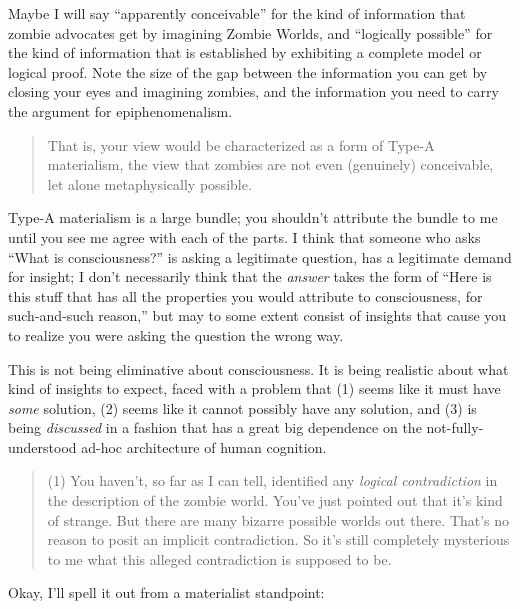 {
 Maybe I will say ``apparently
conceivable'' for the kind of information that zombie
advocates get by imagining Zombie Worlds, and
``logically possible'' for the kind
of information that is established by exhibiting a complete model or
logical proof. Note the size of the gap between the information you can
get by closing your eyes and imagining zombies, and the information you
need to carry the argument for epiphenomenalism.}

\begin{quotation}

{
 That is, your view would be characterized as a form of Type-A
materialism, the view that zombies are not even (genuinely)
conceivable, let alone metaphysically possible.}

\end{quotation}

{
 Type-A materialism is a large bundle; you
shouldn't attribute the bundle to me until you see me
agree with each of the parts. I think that someone who asks
``What is consciousness?'' is asking
a legitimate question, has a legitimate demand for insight; I
don't necessarily think that the \textit{answer} takes
the form of ``Here is this stuff that has all the
properties you would attribute to consciousness, for such-and-such
reason,'' but may to some extent consist of insights
that cause you to realize you were asking the question the wrong way.}

{
 This is not being eliminative about consciousness. It is being
realistic about what kind of insights to expect, faced with a problem
that (1) seems like it must have \textit{some} solution, (2) seems like
it cannot possibly have any solution, and (3) is being
\textit{discussed} in a fashion that has a great big dependence on the
not-fully-understood ad-hoc architecture of human cognition.}

\begin{quotation}
{
 (1) You haven't, so far as I can tell, identified
any \textit{logical contradiction} in the description of the zombie
world. You've just pointed out that
it's kind of strange. But there are many bizarre
possible worlds out there. That's no reason to posit an
implicit contradiction. So it's still completely
mysterious to me what this alleged contradiction is supposed to be.}
\end{quotation}

{
 Okay, I'll spell it out from a materialist
standpoint:}

